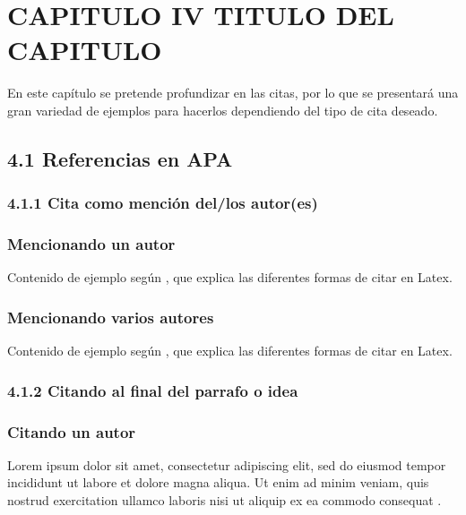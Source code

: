 \chapter*{CAPITULO IV TITULO DEL CAPITULO}
En este capítulo se pretende profundizar en las citas, por lo que se presentará una gran variedad de ejemplos para hacerlos dependiendo del tipo de cita deseado.

\section{4.1 Referencias en APA}

\subsection{4.1.1 Cita como mención del/los autor(es)}

\subsection*{Mencionando un autor}

Contenido de ejemplo según \textcite{articulo:ejemplo_2}, que explica las diferentes formas de citar en Latex.


\subsection*{Mencionando varios autores}

Contenido de ejemplo según \textcite{libro:ejemplo_varios_autores}, que explica las diferentes formas de citar en Latex.


\subsection{4.1.2 Citando al final del parrafo o idea}

\subsection*{Citando un autor}

Lorem ipsum dolor sit amet, consectetur adipiscing elit, sed do eiusmod tempor incididunt ut labore et dolore magna aliqua. Ut enim ad minim veniam, quis nostrud exercitation ullamco laboris nisi ut aliquip ex ea commodo consequat \parencite{articulo:ejemplo_2}.


